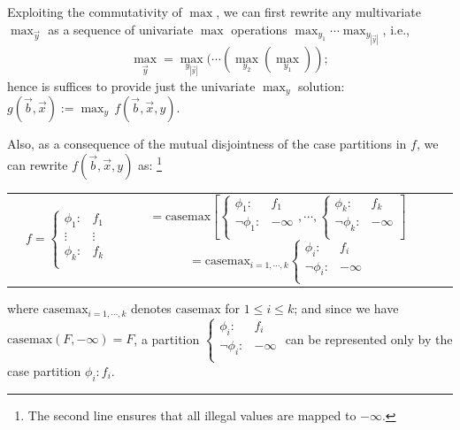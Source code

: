 \documentclass[twoside,11pt]{article}
\newcommand{\casemax}{\mathrm{casemax}}
\begin{document}
Exploiting the commutativity of $\max$, we can first rewrite any multivariate $\max_{\vec{y}}$ as a sequence of univariate $\max$ operations 
$\max_{y_1} \cdots \max_{y_{|\vec{y}|}}$, i.e., 
$$\max_{\vec{y}}= \max_{y_{|\vec{y}|}} (\cdots (\max_{y_2}(\max_{y_1}));$$ hence is suffices to provide just the univariate $\max_{y}$ solution: $g(\vec{b},\vec{x}) := \max_{y}
\, f(\vec{b},\vec{x},y)$.

Also, as a consequence of the mutual disjointness of the case partitions in $f$, we can rewrite $f(\vec{b},\vec{x},y)$ as: \footnote{The second line ensures that all illegal values are mapped to $-\infty$.}

{%
\begin{center}
\begin{tabular}{r c c l}
&
\hspace{-6mm} 
  $f = \begin{cases}
    \phi_1: & f_1 \\ 
   \vdots&\vdots\\ 
    \phi_k: & f_k \\ 
  \end{cases}$
&
\hspace{-2mm}
  $ =  \casemax \left[  \begin{cases}
    \phi_1: & f_1 \\
    \neg \phi_1: & -\infty \\    
  \end{cases}, 
  \cdots ,
  \begin{cases}
    \phi_k: & f_k \\
    \neg \phi_k: & -\infty \\    
  \end{cases}   
  \right]$
  \hspace{-2mm}
  $ = \casemax_{i=1,\cdots,k}\begin{cases}
    \phi_i: & f_i \\
    \neg \phi_i: & -\infty \\    
  \end{cases}$
  
\end{tabular}
\end{center}
}
where $\casemax_{i=1,\cdots,k}$ denotes $\casemax$ for $1\leq i \leq k$; and since we have $\casemax(F, -\infty) = F$, a partition 
$ \begin{cases}
    \phi_i: & f_i \\
    \neg \phi_i: & -\infty \\    
  \end{cases}$ can be represented only by the case partition $\phi_i : f_i$.   
\end{document}
